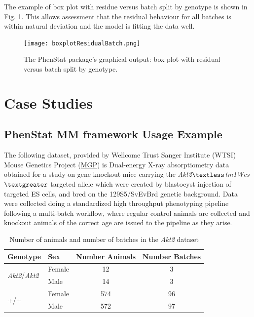 \documentclass[12pt,a4paper]{article}
\begin{document}
The example of box plot with residue versus batch split by genotype is shown in Fig. \ref{fig:14}. This allows assessment that the residual behaviour for all batches is within natural deviation and the model is fitting the data well.
\begin{figure}[!htpb]%
\centerline{\texttt{[image: boxplotResidualBatch.png]}}
\caption{The PhenStat package's graphical output: box plot with residual versus batch split by genotype.}\label{fig:14}
\end{figure}
   
\section{Case Studies}
\subsection{PhenStat MM framework Usage Example}
The following dataset, provided by Wellcome Trust Sanger Institute (WTSI) Mouse Genetics Project (\href{http://www.sanger.ac.uk/resources/mouse/}{MGP}) 
is Dual-energy X-ray absorptiometry data obtained for a study on gene knockout mice carrying the \textit{Akt2$\textless$tm1Wcs$\textgreater$} targeted allele which were created by blastocyst 
injection of targeted ES cells, and bred on the 129S5\//SvEvBrd genetic background.  
Data were collected doing a standardized high throughput phenotyping pipeline following a multi-batch workflow, where regular control animals are collected and knockout animals of the correct age are issued to the pipeline as they arise.  

\begin{table}[!h]
\begin{center}
\begin{tabular}{| l | l | c | c |}
  \hline
Genotype&Sex&Number Animals&Number Batches\\\hline
\multirow{2}{*}{\textit{Akt2}\slash \textit{Akt2}}&Female&12&3\\
			    &Male&14&3\\
			    \hline
\multirow{2}{*}{+\slash +}&Female&574&96\\
			    &Male&572&97\\

\hline  
\end{tabular}
\caption{Number of animals and number of batches in the \textit{Akt2} dataset}\label{table:08}
\end{center}
\end{table}
\end{document}
